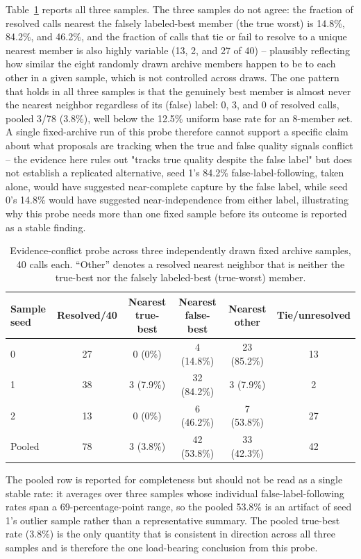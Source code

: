 Table~\ref{tab:conflict-samples} reports all three samples. The three samples do not agree: the fraction of resolved calls nearest the falsely labeled-best member (the true worst) is 14.8\%, 84.2\%, and 46.2\%, and the fraction of calls that tie or fail to resolve to a unique nearest member is also highly variable (13, 2, and 27 of 40) -- plausibly reflecting how similar the eight randomly drawn archive members happen to be to each other in a given sample, which is not controlled across draws. The one pattern that holds in all three samples is that the genuinely best member is almost never the nearest neighbor regardless of its (false) label: 0, 3, and 0 of resolved calls, pooled 3/78 (3.8\%), well below the 12.5\% uniform base rate for an 8-member set. A single fixed-archive run of this probe therefore cannot support a specific claim about what proposals are tracking when the true and false quality signals conflict -- the evidence here rules out "tracks true quality despite the false label" but does not establish a replicated alternative, seed 1's 84.2\% false-label-following, taken alone, would have suggested near-complete capture by the false label, while seed 0's 14.8\% would have suggested near-independence from either label, illustrating why this probe needs more than one fixed sample before its outcome is reported as a stable finding.

\begin{table}[htbp]
\caption{Evidence-conflict probe across three independently drawn fixed archive samples, 40 calls each. ``Other'' denotes a resolved nearest neighbor that is neither the true-best nor the falsely labeled-best (true-worst) member.}
\label{tab:conflict-samples}
\centering
\begin{tabular}{@{}lccccc@{}}
\toprule
Sample seed & Resolved/40 & Nearest true-best & Nearest false-best & Nearest other & Tie/unresolved \\
\midrule
0 & 27 & 0 (0\%) & 4 (14.8\%) & 23 (85.2\%) & 13 \\
1 & 38 & 3 (7.9\%) & 32 (84.2\%) & 3 (7.9\%) & 2 \\
2 & 13 & 0 (0\%) & 6 (46.2\%) & 7 (53.8\%) & 27 \\
\midrule
Pooled & 78 & 3 (3.8\%) & 42 (53.8\%) & 33 (42.3\%) & 42 \\
\bottomrule
\end{tabular}
\end{table}

The pooled row is reported for completeness but should not be read as a single stable rate: it averages over three samples whose individual false-label-following rates span a 69-percentage-point range, so the pooled 53.8\% is an artifact of seed 1's outlier sample rather than a representative summary. The pooled true-best rate (3.8\%) is the only quantity that is consistent in direction across all three samples and is therefore the one load-bearing conclusion from this probe.

